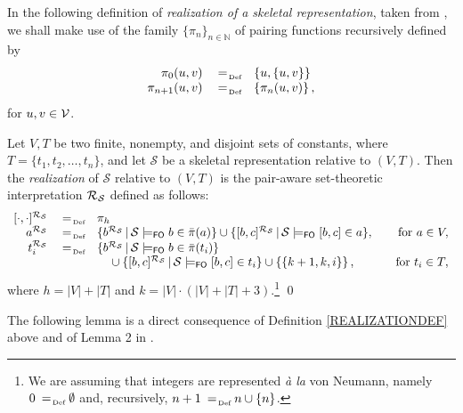 \documentclass[a4paper]{llncs}
\newcommand{\nonpairssym}{\bar{\pi}}
\newcommand{\nonpairs}[1]{\nonpairssym(#1)}
\newcommand{\atset}{\mathcal{S}}
\newcommand{\consta}{a}
\newcommand{\constb}{b}
\newcommand{\constc}{c}
\newcommand{\fomodels}[2]{#1 \models_{\mathsf{FO}} #2}
\begin{document}
In the following definition of \emph{realization of a skeletal
representation}, taken from \cite[Definition~1]{CanLonNic2011},
we shall make use of the family $\{\pi_n\}_{n \in \mathbb{N}}$ of
pairing functions recursively defined by
$$
\begin{array}{rcl}
   \pi_0(u,v) & \defAs & \{u, \{u,v\}\}\\
   \pi_{n+1}(u,v) & \defAs & \{ \pi_n(u,v)\}\, ,
\end{array}
$$
for $u,v \in \mathcal{V}$.

\begin{definition}\label{REALIZATIONDEF}
Let $V,T$ be two finite, nonempty, and disjoint sets of constants, 
where $T=\{t_1, t_2, \ldots, t_n\}$, and let $\atset$ be a skeletal 
representation relative to $(V,T)$.
%
Then the \emph{realization} of $\atset$ relative to $(V,T)$ is
the pair-aware set-theoretic interpretation $\Realization_{\!\atset}$ 
defined as follows:
\[
\begin{array}{rclr}
	[\cdot,\cdot]^{\Realization_{\!\atset}} & \defAs &  \pi_{h} & \\
	\consta^{\Realization_{\!\atset}} & \defAs & 
\{\constb^{\Realization_{\!\atset}} \, | \, \fomodels{\atset}{\constb 
\in \nonpairs{\consta}}\} \cup 
\{[\constb,\constc]^{\Realization_{\!\atset}} \, | \, 
\fomodels{\atset}{[\constb,\constc] \in \consta}\},~~~& \mbox{for 
}\consta \in V,\\
	t_i^{\Realization_{\!\atset}} & \defAs & 
\{\constb^{\Realization_{\!\atset}} \, | \, \fomodels{\atset}{\constb 
\in \nonpairs{t_i}}\}  &\\
	&&\quad {} \cup \{[\constb,\constc]^{\Realization_{\!\atset}} 
\, | \, \fomodels{\atset}{[\constb,\constc] \in t_i} \} \cup \left\{ 
\left\{k+1, k, i\right\} \right\}, & \mbox{for }t_i\in T,\\
\end{array}
\]
where $h = |V|+|T|$ and  $k=|V| \cdot (|V| + |T| + 3)$.\footnote{We 
are assuming that
integers are represented \emph{\`a la} von Neumann, namely $0 \defAs
\emptyset$ and, recursively, $n+1 \defAs n \cup \{n\}$.} \qed
\end{definition}
%
The following lemma is a direct consequence of Definition 
\ref{REALIZATIONDEF} above and of Lemma 2 in 
\cite{CanLonNic2011}.
\end{document}
